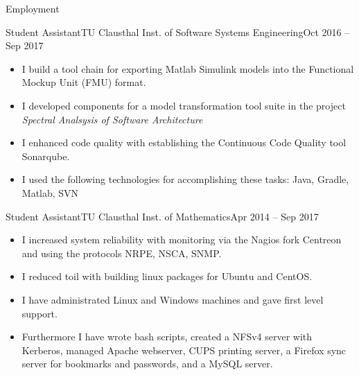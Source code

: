 \documentclass[]{mcdowellcv}
\begin{document}
\begin{cvsection}{Employment}
\begin{cvsubsection}{Student Assistant}{TU Clausthal Inst. of Software Systems Engineering}{Oct 2016 -- Sep 2017}
\bigskip
\begin{itemize}
\item I build a tool chain for exporting Matlab Simulink models into the Functional Mockup Unit (FMU) format.
\item I developed components for a model transformation tool suite in the project \emph{Spectral Analsysis of Software Architecture}
\item I enhanced code quality with establishing the Continuous Code Quality tool Sonarqube.
\item I used the following technologies for accomplishing these tasks: Java, Gradle, Matlab, SVN
\end{itemize}
\end{cvsubsection}

\begin{cvsubsection}{Student Assistant}{TU Clausthal Inst. of Mathematics}{Apr 2014 -- Sep 2017}
\bigskip
\begin{itemize}
\item I increased system reliability with monitoring via the Nagios fork Centreon and using the protocols NRPE, NSCA, SNMP.
\item I reduced toil with building linux packages for Ubuntu and CentOS.
\item I have administrated Linux and Windows machines and gave first level support.
\item Furthermore I have wrote bash scripts, created a NFSv4 server with Kerberos, managed Apache webserver, CUPS printing server, a Firefox sync server for bookmarks and passwords, and a MySQL server.
\end{itemize}
\end{cvsubsection}

\end{cvsection}
\end{document}
